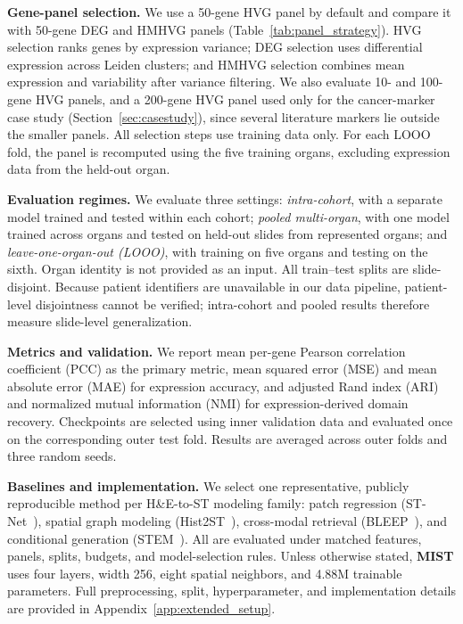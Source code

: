 \documentclass[11pt]{article}
\newcommand{\morph}{\textbf{MIST}}
\begin{document}
\noindent\textbf{Gene-panel selection.}\quad
We use a 50-gene HVG panel by default and compare it with 50-gene
DEG and HMHVG panels (Table~\ref{tab:panel_strategy}).
HVG selection ranks genes by expression variance; DEG selection
uses differential expression across Leiden clusters; and HMHVG
selection combines mean expression and variability after variance
filtering. We also evaluate 10- and 100-gene HVG panels, and a
200-gene HVG panel used only for the cancer-marker case study
(Section~\ref{sec:casestudy}), since several literature markers lie
outside the smaller panels.
All selection steps use training data only. For each LOOO fold,
the panel is recomputed using the five training organs, excluding
expression data from the held-out organ.

\noindent\textbf{Evaluation regimes.}\quad
We evaluate three settings:
\emph{intra-cohort}, with a separate model trained and tested within
each cohort;
\emph{pooled multi-organ}, with one model trained across organs
and tested on held-out slides from represented organs; and
\emph{leave-one-organ-out (LOOO)}, with training on five organs
and testing on the sixth.
Organ identity is not provided as an input.
All train--test splits are slide-disjoint. Because patient
identifiers are unavailable in our data pipeline, patient-level
disjointness cannot be verified; intra-cohort and pooled results
therefore measure slide-level generalization.

\noindent\textbf{Metrics and validation.}\quad
We report mean per-gene Pearson correlation coefficient (PCC)
as the primary metric, mean squared error (MSE) and mean absolute
error (MAE) for expression accuracy, and adjusted Rand index (ARI)
and normalized mutual information (NMI) for expression-derived
domain recovery. Checkpoints are selected using inner validation data and
evaluated once on the corresponding outer test fold. Results are
averaged across outer folds and three random seeds.

\noindent\textbf{Baselines and implementation.}\quad
We select one representative, publicly reproducible method per H\&E-to-ST modeling family: patch
regression (ST-Net~\cite{he2020stnet}), spatial graph modeling (Hist2ST~\cite{zeng2022hist2st}),
cross-modal retrieval (BLEEP~\cite{xie2023bleep}), and conditional generation
(STEM~\cite{zhu2025diffusion}). All are evaluated under matched features, panels,
splits, budgets, and model-selection rules. Unless otherwise stated, \morph{}
uses four layers, width 256, eight spatial neighbors, and 4.88M trainable
parameters. Full preprocessing, split, hyperparameter, and implementation
details are provided in Appendix~\ref{app:extended_setup}.
\end{document}
